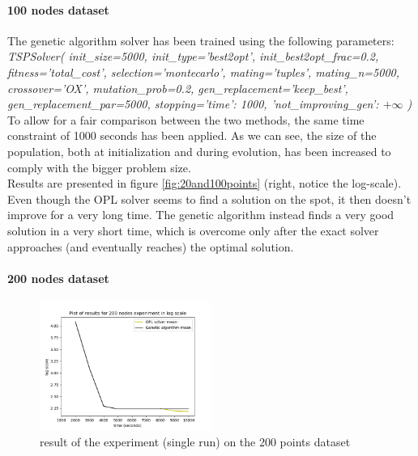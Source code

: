 \documentclass{article}
\begin{document}
\paragraph*{100 nodes dataset}

The genetic algorithm solver has been trained using the following parameters: \\
\newpage
\textit{TSPSolver(
        init\_size=5000, init\_type='best2opt', init\_best2opt\_frac=0.2, fitness='total\_cost',
        selection='montecarlo', mating='tuples', mating\_n=5000, crossover='OX', mutation\_prob=0.2,
        gen\_replacement='keep\_best', gen\_replacement\_par=5000,
        stopping={'time': 1000, 'not\_improving\_gen': $+\infty$}
    )} \\
\newline
To allow for a fair comparison between the two methods, the same time constraint of 1000 seconds has been applied. As we can see, the size of the population, both at initialization and during evolution, has been increased to comply with the bigger problem size. \\
Results are presented in figure \ref{fig:20and100points} (right, notice the log-scale). Even though the OPL solver seems to find a solution on the spot, it then doesn't improve for a very long time. The genetic algorithm instead finds a very good solution in a very short time, which is overcome only after the exact solver approaches (and eventually reaches) the optimal solution.


\paragraph*{200 nodes dataset}

\begin{figure}
    \centering
\includegraphics[width=0.5\textwidth]{pics/200_nodes_results.png}
\caption{result of the experiment (single run) on the 200 points dataset}
\label{fig:200points}
\end{figure}
\end{document}
